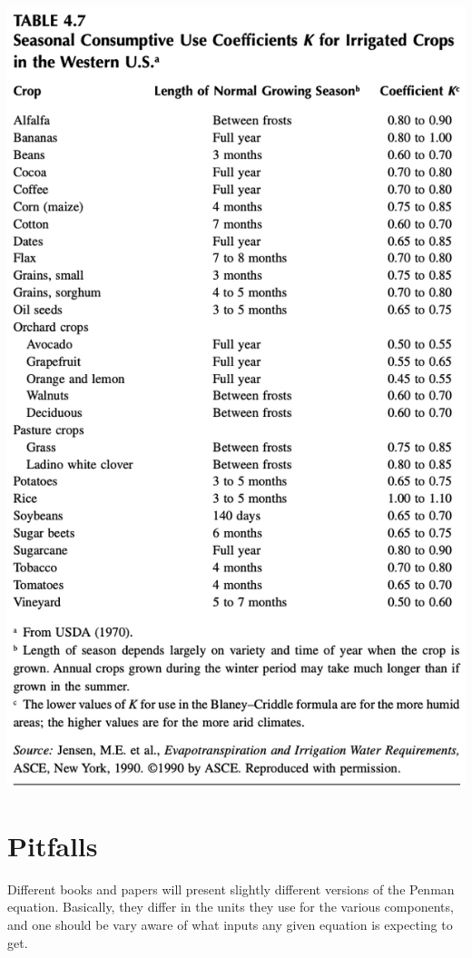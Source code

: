 \documentclass[
  letterpaper,
  DIV=11,
  numbers=noendperiod]{scrreprt}
\begin{document}
\includegraphics{archive/figures/trimble-table4.7.png}

\hypertarget{pitfalls}{%
\section{Pitfalls}\label{pitfalls}}

Different books and papers will present slightly different versions of
the Penman equation. Basically, they differ in the units they use for
the various components, and one should be vary aware of what inputs any
given equation is expecting to get.
\end{document}
